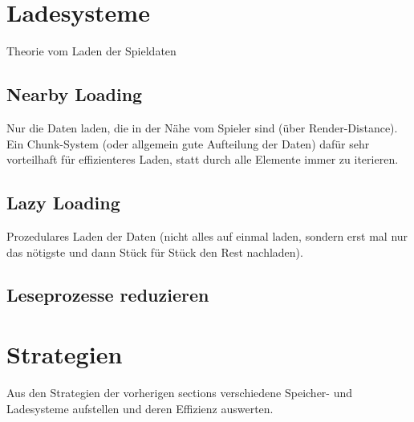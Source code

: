 \section{Ladesysteme}\label{sect:ladesysteme}
Theorie vom Laden der Spieldaten


\subsection{Nearby Loading}
Nur die Daten laden, die in der Nähe vom Spieler sind (über Render-Distance). Ein Chunk-System (oder allgemein gute Aufteilung der Daten) dafür sehr vorteilhaft für effizienteres Laden, statt durch alle Elemente immer zu iterieren.


\subsection{Lazy Loading}
Prozedulares Laden der Daten (nicht alles auf einmal laden, sondern erst mal nur das nötigste und dann Stück für Stück den Rest nachladen). 


\subsection{Leseprozesse reduzieren}




\section{Strategien}
Aus den Strategien der vorherigen sections verschiedene Speicher- und Ladesysteme aufstellen und deren Effizienz auswerten.

